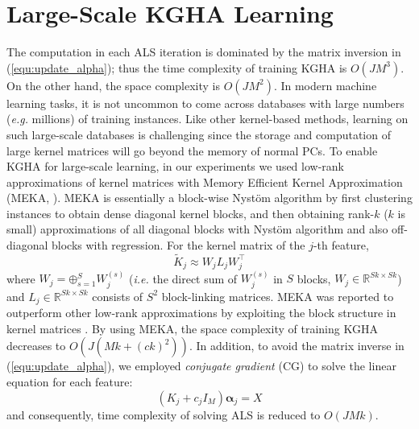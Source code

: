 \documentclass[a4paper]{article}
\begin{document}
\section{Large-Scale KGHA Learning}
\label{sec:large_scale}
The computation in each ALS iteration is dominated by the matrix inversion in (\ref{equ:update_alpha});
thus the time complexity of training KGHA is $O(JM^3)$. 
On the other hand, the space complexity is $O(JM^2)$. 
In modern machine learning tasks, it is not uncommon to come across databases with large numbers (\emph{e.g.} millions) of training instances. 
Like other kernel-based methods, learning on such large-scale databases is challenging since the storage and computation of large kernel matrices          
will go beyond the memory of normal PCs. To enable KGHA for large-scale learning, in our experiments we used low-rank approximations of kernel matrices with  
Memory Efficient Kernel Approximation (MEKA, \citeauthor{BlockNystrom}\citeyear{BlockNystrom}). MEKA is essentially a block-wise Nyst{\"o}m algorithm by first clustering 
instances to obtain dense diagonal kernel blocks, and then obtaining rank-$k$ ($k$ is small) approximations of all diagonal blocks with Nyst{\"o}m algorithm and also off-diagonal blocks
with regression. For the kernel matrix of the $j$-th 
feature, 
\begin{equation}
    \tilde{K}_j\approx W_j L_j W_j^\top
\end{equation}
where $W_j=\boldsymbol{\oplus}_{s=1}^S W_j^{(s)}$ (\emph{i.e.} the direct sum of $W_j^{(s)}$ in $S$ blocks, $W_j\in\mathbb{R}^{Sk\times Sk}$)
and $L_j\in\mathbb{R}^{Sk\times Sk}$ consists of $S^2$ block-linking matrices. 
MEKA was reported 
to outperform other low-rank approximations by exploiting the block structure in kernel matrices \cite{BlockNystrom}.  
By using MEKA, the space complexity of training KGHA decreases to $O(J(Mk+(ck)^2))$. 
In addition, to avoid the matrix inverse in (\ref{equ:update_alpha}), we employed \emph{conjugate gradient} (CG) to solve the linear equation for each feature: 
\begin{equation}
    (K_j+c_j I_M)\boldsymbol{\alpha}_j=X 
    \label{equ:linear_equation}
\end{equation}
and consequently, time complexity of solving ALS is reduced to $O(JMk)$.   
\end{document}

